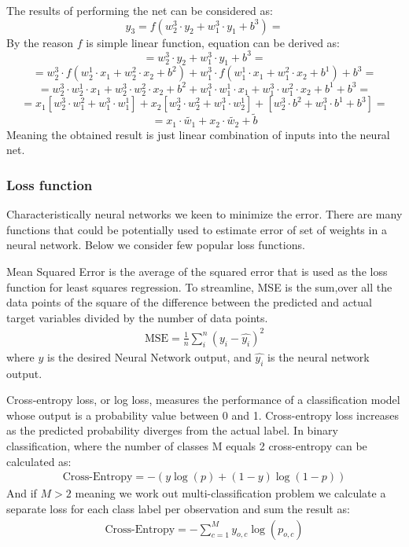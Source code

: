 The results of performing the net can be considered as:
\[ y_3 = f(w_2^3 \cdot y_2+w_1^3 \cdot y_1+b^3) = \]
By the reason $f$ is simple linear function, equation can be derived as:
\[ = w_2^3 \cdot y_2+w_1^3 \cdot y_1+b^3 = \] 
\[ = w_2^3 \cdot f(w_2^1\cdot x_1+w_2^2 \cdot x_2+b^2) + w_1^3 \cdot f(w_1^1 \cdot x_1+w_1^2 \cdot x_2+b^1) + b^3 = \]   
\[ = w_2^3 \cdot w_2^1 \cdot x_1+w_2^3 \cdot w_2^2 \cdot x_2+b^2 + w_1^3 \cdot w_1^1 \cdot x_1+w_1^3 \cdot w_1^2 \cdot x_2+b^1+b^3 = \]
\[ = x_1[w_2^3 \cdot w_1^2 + w_1^3 \cdot w_1^1] + x_2[w_2^3 \cdot w_2^2 + w_1^3 \cdot w_2^1] + [w_2^3 \cdot b^2+w_1^3 \cdot b^1+b^3] = \]
\[ =  x_1\cdot \tilde{w_1} + x_2\cdot \tilde{w_2} + \tilde{b} \]
Meaning the obtained result is just linear combination of inputs into the neural net. 
\subsubsection{Loss function}
Characteristically neural networks we keen to minimize the error. There are many functions that could be potentially used to estimate error of set of weights in a neural network. Below we consider few popular loss functions.

Mean Squared Error is the average of the squared error that is used as the loss function for least squares regression. To streamline, MSE is the sum,over all the data points of the square of the difference between the predicted and actual target variables divided by the number of data points.
\begin{align*}
\text{MSE} = \frac{{1}}{n} \sum_{i}^{n} (y_i - \widehat{y_i})^2
\end{align*}
where $y$ is the desired Neural Network output, and $\widehat{y_i}$ is the neural network output.

Cross-entropy loss, or log loss, measures the performance of a classification model whose output is a probability value between 0 and 1. Cross-entropy loss increases as the predicted probability diverges from the actual label.
In binary classification, where the number of classes M equals 2 cross-entropy can be calculated as:
\begin{align*}
\text{Cross-Entropy} = -{(y\log(p) + (1 - y)\log(1 - p))}
\end{align*}
And if $M > 2$ meaning we work out multi-classification problem we calculate a separate loss for each class label per observation and sum the result as:
\begin{align*}
\text{Cross-Entropy} = -\sum_{c=1}^My_{o,c}\log(p_{o,c})
\end{align*}

